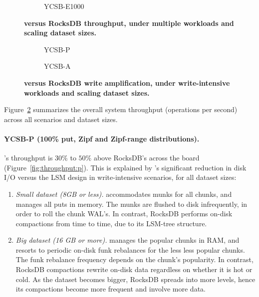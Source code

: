 \begin{figure}[tb]
\begin{subfigure}{0.3\linewidth}
\caption{YCSB-E1000}
\label{fig:throughput:e1000}
\end{subfigure}
\caption{\bf{\sys\/ versus RocksDB throughput, under multiple workloads and scaling dataset sizes.}}
\label{fig:throughput}
\end{figure}

\begin{figure}
\centering
\hspace{0.05\linewidth}
\begin{subfigure}{0.3\linewidth}
\caption{YCSB-P}
\label{fig:writeamp:p}
\end{subfigure}
\hspace{0.05\linewidth}
\begin{subfigure}{0.25\linewidth}
\caption{YCSB-A}
\label{fig:writeamp:a}
\end{subfigure}
\caption{\bf{\sys\/ versus RocksDB write amplification, under write-intensive workloads and scaling dataset sizes.}}
\label{fig:writeamp}
\end{figure}

Figure~\ref{fig:throughput} summarizes the overall system throughput (operations per second) 
across all scenarios and dataset sizes. 

\paragraph{YCSB-P (100\% put, Zipf and Zipf-range distributions).} 
\sys's throughput is $30\%$ to $50\%$ above RocksDB's across the board 
(Figure~\ref{fig:throughput:p}). This is explained by \sys's significant reduction 
in disk I/O versus the LSM design in write-intensive scenarios, for all dataset sizes: 

\begin{enumerate}
\item {\em Small dataset (8GB or less).} \sys\/ accommodates munks for all chunks,
and manages all puts in memory. The munks are flushed to disk infrequently, in order 
to roll the chunk WAL's. In contrast, RocksDB performs on-disk compactions from time 
to time, due to its LSM-tree structure.   

\item{\em Big dataset (16 GB or more).} \sys\/ manages the popular chunks in RAM, 
and resorts to periodic on-disk funk rebalances for the less less popular chunks. The 
funk rebalance frequency depends on the chunk's popularity. In contrast, RocksDB 
compactions rewrite on-disk data regardless on whether it is hot or cold. As the dataset
becomes bigger, RocksDB spreads into more levels, hence its compactions become 
more frequent and involve more data.  
\end{enumerate}

